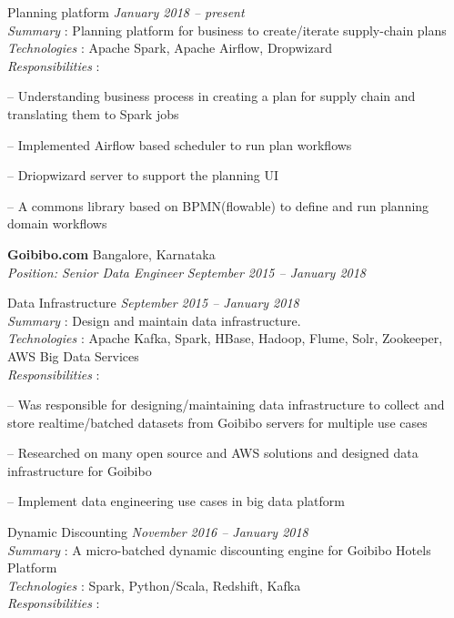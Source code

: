\documentclass[margin,line]{resume}
\begin{document}
\begin{resume}
    
	    Planning platform				 				\hfill \textit{January 2018  -- present} \\ 
    \textit{Summary} : Planning platform for business to create/iterate supply-chain plans \\
    \textit{Technologies} : Apache Spark, Apache Airflow, Dropwizard \\
    \textit{Responsibilities} : 
    \begin{list2}
    	\item[--] Understanding business process in creating a plan for supply chain and translating them to Spark jobs
    	\item[--] Implemented Airflow based scheduler to run plan workflows
    	\item[--] Driopwizard server to support the planning UI
    	\item[--] A  commons library based on BPMN(flowable) to define and run planning domain workflows
    \end{list2}
    
    \textbf{Goibibo.com } 				\hfill  Bangalore, Karnataka \\
      \textit{Position: Senior Data Engineer } 			\hfill \textit{September 2015 -- January 2018}
  

Data Infrastructure				 				\hfill \textit{September 2015  -- January 2018} \\ 
\textit{Summary} : Design and maintain data infrastructure. \\
      \textit{Technologies} : Apache Kafka, Spark, HBase, Hadoop, Flume, Solr, Zookeeper, AWS Big Data Services \\
\textit{Responsibilities} : 
     	 	\begin{list2}
         \item[--] Was responsible for designing/maintaining data infrastructure to collect and store realtime/batched datasets from Goibibo servers for multiple use cases
	\item[--] Researched on many open source and AWS solutions and designed data infrastructure for Goibibo
	\item[--] Implement data engineering use cases in big data platform
	\end{list2}

Dynamic Discounting				 \hfill \textit{November 2016 -- January 2018} \\
\textit{Summary} :  A micro-batched dynamic discounting engine for Goibibo Hotels Platform	 \\
      \textit{Technologies} : Spark, Python/Scala, Redshift, Kafka \\
      \textit{Responsibilities} : 


\end{resume}
\end{document}
